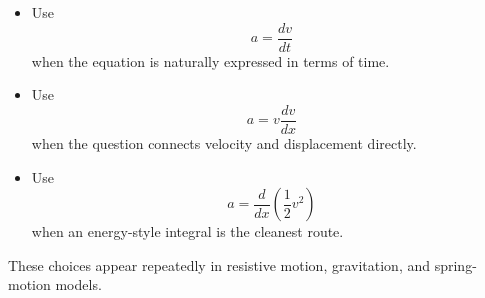 \begin{itemize}[leftmargin=*]
  \item Use
  \[
  a=\frac{dv}{dt}
  \]
  when the equation is naturally expressed in terms of time.
  \item Use
  \[
  a=v\frac{dv}{dx}
  \]
  when the question connects velocity and displacement directly.
  \item Use
  \[
  a=\frac{d}{dx}\left(\frac{1}{2}v^2\right)
  \]
  when an energy-style integral is the cleanest route.
\end{itemize}

These choices appear repeatedly in resistive motion, gravitation, and spring-motion models.
